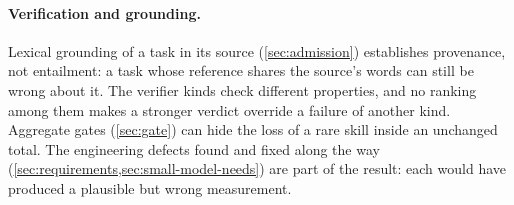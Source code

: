 \paragraph{Verification and grounding.} Lexical grounding of a task in its source (\cref{sec:admission})
establishes provenance, not entailment: a task whose reference shares the source's words can still be
wrong about it. The verifier kinds check different properties, and no ranking among them makes a
stronger verdict override a failure of another kind. Aggregate gates (\cref{sec:gate}) can hide the loss
of a rare skill inside an unchanged total. The engineering defects found and fixed along the way
(\cref{sec:requirements,sec:small-model-needs}) are part of the result: each would have produced a
plausible but wrong measurement.
